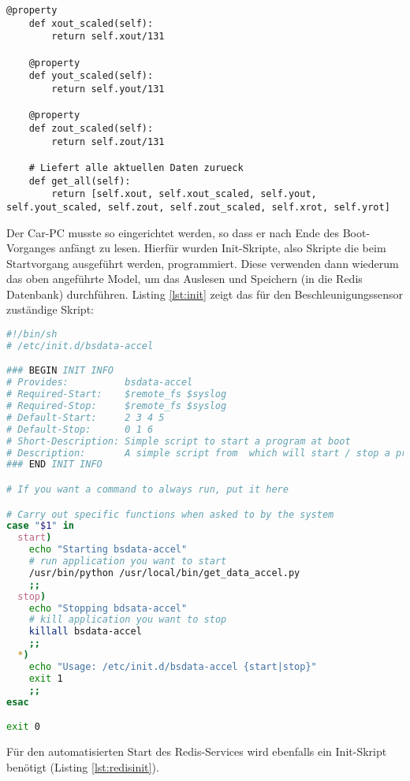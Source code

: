 \begin{lstlisting}[style=pythonstyle, caption=Sensorenmodell, label={lst:sensorsammlung}]
    @property
    def xout_scaled(self):
        return self.xout/131

    @property
    def yout_scaled(self):
        return self.yout/131

    @property
    def zout_scaled(self):
        return self.zout/131

    # Liefert alle aktuellen Daten zurueck
    def get_all(self):
        return [self.xout, self.xout_scaled, self.yout, self.yout_scaled, self.zout, self.zout_scaled, self.xrot, self.yrot]
\end{lstlisting}

Der Car-PC musste so eingerichtet werden, so dass er nach Ende des Boot-Vorganges anfängt zu lesen. Hierfür wurden Init-Skripte, also Skripte die beim Startvorgang ausgeführt werden, programmiert. Diese verwenden dann wiederum das oben angeführte Model, um das Auslesen und Speichern (in die Redis Datenbank) durchführen. Listing \ref{lst:init} zeigt das für den Beschleunigungssensor zuständige Skript:

\begin{lstlisting}[language=Bash, caption=Beschleunigungssensor Service, label={lst:init}]
#!/bin/sh
# /etc/init.d/bsdata-accel

### BEGIN INIT INFO
# Provides:          bsdata-accel
# Required-Start:    $remote_fs $syslog
# Required-Stop:     $remote_fs $syslog
# Default-Start:     2 3 4 5
# Default-Stop:      0 1 6
# Short-Description: Simple script to start a program at boot
# Description:       A simple script from  which will start / stop a program a boot / shutdown.
### END INIT INFO

# If you want a command to always run, put it here

# Carry out specific functions when asked to by the system
case "$1" in
  start)
    echo "Starting bsdata-accel"
    # run application you want to start
    /usr/bin/python /usr/local/bin/get_data_accel.py
    ;;
  stop)
    echo "Stopping bdsata-accel"
    # kill application you want to stop
    killall bsdata-accel
    ;;
  *)
    echo "Usage: /etc/init.d/bsdata-accel {start|stop}"
    exit 1
    ;;
esac

exit 0
\end{lstlisting}

Für den automatisierten Start des Redis-Services wird ebenfalls ein Init-Skript benötigt (Listing \ref{lst:redisinit}).

